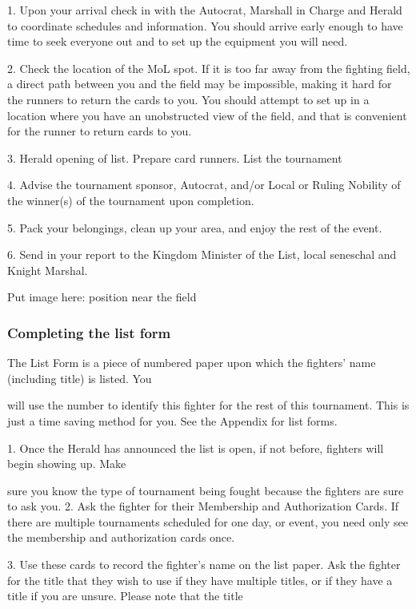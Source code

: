 \documentclass{article}
\begin{document}
1. Upon your arrival check in with the Autocrat, Marshall in Charge and Herald to coordinate
schedules and information. You should arrive early enough to have time to seek everyone out and to
set up the equipment you will need.

2. Check the location of the MoL spot. If it is too far away from the fighting field, a direct path
between you and the field may be impossible, making it hard for the runners to return the cards to
you. You should attempt to set up in a location where you have an unobstructed view of the field,
and that is convenient for the runner to return cards to you.

3. Herald opening of list. Prepare card runners. List the tournament

4. Advise the tournament sponsor, Autocrat, and/or Local or Ruling Nobility of the winner(s) of the
tournament upon completion.

5. Pack your belongings, clean up your area, and enjoy the rest of the event.

6. Send in your report to the Kingdom Minister of the List, local seneschal and Knight Marshal.



Put image here: position near the field



\subsubsection{Completing the list form}

The List Form is a piece of numbered paper upon which the fighters’ name (including title) is listed. You

will use the number to identify this fighter for the rest of this tournament. This is just a time saving
method for you. See the Appendix for list forms.

1. Once the Herald has announced the list is open, if not before, fighters will begin showing up. Make

sure you know the type of tournament being fought because the fighters are sure to ask you.
2. Ask the fighter for their Membership and Authorization Cards. If there are multiple tournaments
scheduled for one day, or event, you need only see the membership and authorization cards once.

3. Use these cards to record the fighter’s name on the list paper. Ask the fighter for the title that they
wish to use if they have multiple titles, or if they have a title if you are unsure. Please note that the title
\end{document}
